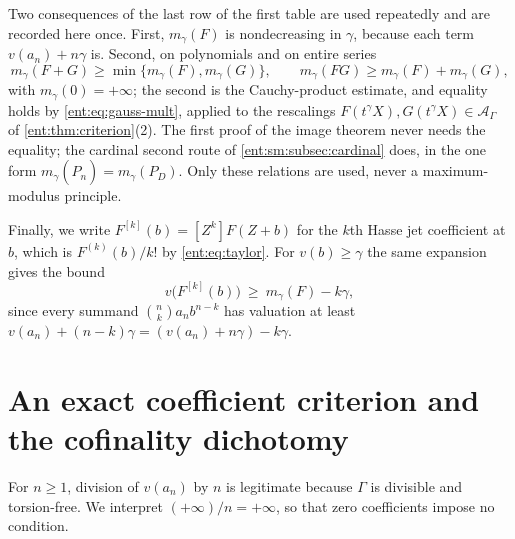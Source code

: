 \documentclass[11pt]{article}
\theoremstyle{plain}
\theoremstyle{plain}
\theoremstyle{plain}
\theoremstyle{definition}
\theoremstyle{definition}
\theoremstyle{definition}
\theoremstyle{definition}
\theoremstyle{remark}
\newcommand{\A}{\mathcal A_\Gamma}\newcommand{\OO}{\mathcal O_\Gamma}
\begin{document}
Two consequences of the last row of the first table are used repeatedly and
are recorded here once. First, $m_\gamma(F)$ is nondecreasing in $\gamma$, because each term
$v(a_n)+n\gamma$ is. Second, on polynomials and on entire series
\[
 m_\gamma(F+G)\ge\min\{m_\gamma(F),m_\gamma(G)\},\qquad
 m_\gamma(FG)\ge m_\gamma(F)+m_\gamma(G),
\]
with $m_\gamma(0)=+\infty$; the second is the Cauchy-product estimate, and
equality holds by \eqref{ent:eq:gauss-mult}, applied to the rescalings
$F(t^\gamma X),G(t^\gamma X)\in\A$ of \cref{ent:thm:criterion}(2). The first
proof of the image theorem never needs the equality; the cardinal second
route of \cref{ent:sm:subsec:cardinal} does, in the one form
$m_\gamma(\widehat P_n)=m_\gamma(P_D)$. Only these relations are used, never
a maximum-modulus principle.

Finally, we write $F^{[k]}(b)=[Z^k]F(Z+b)$ for the $k$th Hasse jet
coefficient at $b$, which is $F^{(k)}(b)/k!$ by \eqref{ent:eq:taylor}. For
$v(b)\ge\gamma$ the same expansion gives the bound
\begin{equation}\label{ent:eq:jet-bound}
 v\bigl(F^{[k]}(b)\bigr)\ \ge\ m_\gamma(F)-k\gamma ,
\end{equation}
since every summand $\binom nk a_nb^{n-k}$ has valuation at least
$v(a_n)+(n-k)\gamma=(v(a_n)+n\gamma)-k\gamma$.

\section{An exact coefficient criterion and the cofinality dichotomy}
\label{ent:sec:growth}

For $n\ge1$, division of $v(a_n)$ by $n$ is legitimate because $\Gamma$ is
divisible and torsion-free. We interpret $(+\infty)/n=+\infty$, so that zero
coefficients impose no condition.
\end{document}
